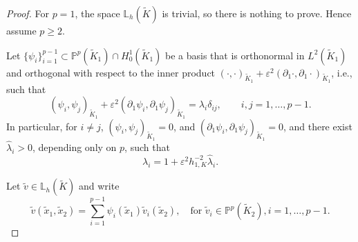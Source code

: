 \documentclass[10pt,a4paper]{amsart}
\newcommand{\IL}{\mathbb{L}}
\newcommand{\IP}{\mathbb{P}}
\newcommand{\Kt}{\widetilde{K}}
\newcommand{\eps}{\varepsilon}
\newcommand{\hKot}{h_{1,K}}
\begin{document}
	\begin{proof}
	For \(p=1\), the space \(\IL_h(\Kt)\) is trivial, so there is nothing to prove. Hence assume \(p\ge2\).
	
	Let \(\{\psi_i\}_{i=1}^{p-1}\subset \IP^p(\Kt_1)\cap H_0^1(\Kt_1)\) be a basis that is orthonormal in $L^2(\Kt_1)$ and orthogonal with respect to the inner product
$
	(\cdot,\cdot)_{\Kt_1}
	+\eps^2(\partial_1\cdot,\partial_1\cdot)_{\Kt_1}
$,  i.e., such that
	\begin{equation}\label{eq:d1ortho}
	(\psi_i,\psi_j)_{\Kt_1}
	+\eps^2(\partial_1\psi_i,\partial_1\psi_j)_{\Kt_1}
	=\lambda_i\delta_{ij},
	\qquad i,j=1,\dots,p-1.
	\end{equation}
	In particular, for \(i\neq j\),
	$
	(\psi_i,\psi_j)_{\Kt_1}=0$, and
	$(\partial_1\psi_i,\partial_1\psi_j)_{\Kt_1}=0$, and there exist $\widehat\lambda_i>0$, depending only on $p$, such that
	\begin{equation*}
    \lambda_i=1+\eps^2\hKot^{-2}\widehat\lambda_i.
	\end{equation*}
	
	Let \(\tilde v\in \IL_h(\Kt)\) and write
	\begin{equation*}
	\tilde v(\widetilde x_1,\widetilde x_2)=\sum_{i=1}^{p-1}\psi_i(\widetilde x_1)\tilde v_i(\widetilde x_2),
	\quad \text{for }\tilde v_i\in \IP^p(\Kt_2),  i = 1, \ldots, p-1.
	\end{equation*}
	

\end{proof}
\end{document}
